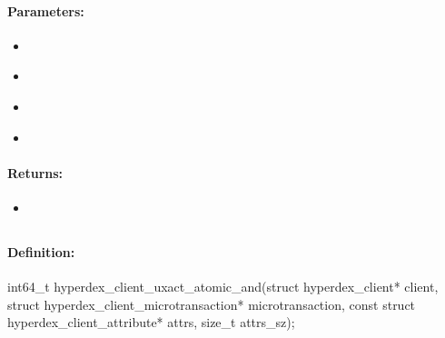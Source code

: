 \paragraph{Parameters:}
\begin{itemize}[noitemsep]
\item {}\\

\item {}\\

\item {}\\

\item {}\\

\end{itemize}

\paragraph{Returns:}
\begin{itemize}[noitemsep]
\item {}\\

\end{itemize}

\pagebreak
\subsection{}
\label{api:c:uxact_atomic_and}


\paragraph{Definition:}
\begin{ccode}
int64_t hyperdex_client_uxact_atomic_and(struct hyperdex_client* client,
        struct hyperdex_client_microtransaction* microtransaction,
        const struct hyperdex_client_attribute* attrs, size_t attrs_sz);
\end{ccode}

